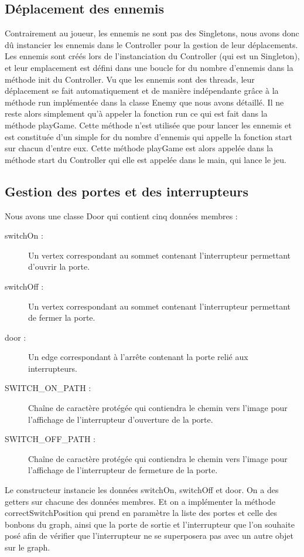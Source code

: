 \documentclass [10pt, a4paper]{article}
\begin{document}
\subsection {Déplacement des ennemis}
Contrairement au joueur, les ennemis ne sont pas des Singletons, nous avons donc dû instancier les ennemis dans le Controller pour la gestion de leur déplacements. Les ennemis sont créés lors de l'instanciation du Controller (qui est un Singleton), et leur emplacement est défini dans une boucle for du nombre d'ennemis dans la méthode init du Controller. Vu que les ennemis sont des threads, leur déplacement se fait automatiquement et de manière indépendante grâce à la méthode run implémentée dans la classe Enemy que nous avons détaillé. Il ne reste alors simplement qu'à appeler la fonction run ce qui est fait dans la méthode playGame. Cette méthode n'est utilisée que pour lancer les ennemis et est constituée d'un simple for du nombre d'ennemis qui appelle la fonction start sur chacun d'entre eux. Cette méthode playGame est alors appelée dans la méthode start du Controller qui elle est appelée dans le main, qui lance le jeu.







\subsection {Gestion des portes et des interrupteurs}
Nous avons une classe Door qui contient cinq données membres :
\begin {description}
\item  [switchOn :]     Un vertex correspondant au sommet contenant l'interrupteur permettant d'ouvrir la porte.
\item  [switchOff :]     Un vertex correspondant au sommet contenant l'interrupteur permettant de fermer la porte.
\item  [door :] Un edge correspondant à l'arrête contenant la porte relié aux interrupteurs.
\item  [SWITCH\_ON\_PATH :] Chaîne de caractère protégée qui contiendra le chemin vers l'image pour l'affichage de l'interrupteur d'ouverture de la porte.
\item  [SWITCH\_OFF\_PATH :] Chaîne de caractère protégée qui contiendra le chemin vers l'image pour l'affichage de l'interrupteur de fermeture de la porte.
\end   {description}
Le constructeur instancie les données switchOn, switchOff et door. On a des getters sur chacune des données membres. Et on a implémenter la méthode correctSwitchPosition qui prend en paramètre la liste des portes et celle des bonbons du graph, ainsi que la porte de sortie et l'interrupteur que l'on souhaite posé afin de vérifier que l'interrupteur ne se superposera pas avec un autre objet sur le graph.
\end{document}
